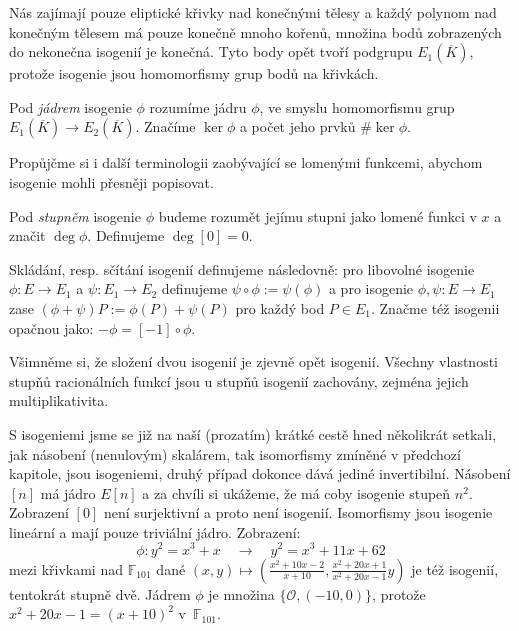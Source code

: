 \documentclass[12pt]{report}
\begin{document}
Nás zajímají pouze eliptické křivky nad konečnými tělesy a každý polynom nad konečným tělesem má pouze konečně mnoho kořenů, množina bodů zobrazených do nekonečna isogenií je konečná. Tyto body opět tvoří podgrupu $E_1 (\overline{K})$, protože isogenie jsou homomorfismy grup bodů na křivkách.

\begin{definice}
Pod \textit{jádrem} isogenie $\phi$ rozumíme jádru $\phi$, ve smyslu homomorfismu grup $E_1 (\overline{K})\longrightarrow E_2(\overline{K})$. Značíme $\ker \phi$ a počet jeho prvků $\# \ker \phi$. 
\end{definice}

Propůjčme si i další terminologii zaobývající se lomenými funkcemi, abychom isogenie mohli přesněji popisovat.

\begin{definice}
Pod \textit{stupněm} isogenie $\phi$ budeme rozumět jejímu stupni jako lomené funkci v $x$ a značit $\deg \phi$. Definujeme $\deg [0] = 0$. 
\end{definice}
 
\begin{znaceni}
Skládání, resp. sčítání isogenií definujeme následovně: pro libovolné isogenie $\phi : E \longrightarrow E_1$ a $\psi : E_1 \longrightarrow E_2$ definujeme $\psi \circ \phi  := \psi(\phi)$ a pro isogenie $\phi,\psi : E \longrightarrow E_1$ zase $(\phi + \psi)P := \phi(P)+\psi(P)$ pro každý bod $P \in E_1$. Značme též isogenii opačnou jako: $- \phi  = [-1] \circ \phi$.
\end{znaceni}

Všimněme si, že složení dvou isogenií je zjevně opět isogenií. Všechny vlastnosti stupňů racionálních funkcí jsou u stupňů isogenií zachovány, zejména jejich multiplikativita.


S isogeniemi jsme se již na naší (prozatím) krátké cestě hned několikrát setkali, jak násobení (nenulovým) skalárem, tak isomorfismy zmíněné v předchozí kapitole, jsou isogeniemi, druhý případ dokonce dává jediné invertibilní. Násobení $[n]$ má jádro $E[n]$ a za chvíli si ukážeme, že má coby isogenie stupeň $n^2$. Zobrazení $[0]$ není surjektivní a proto není isogenií. Isomorfismy jsou isogenie lineární a mají pouze triviální jádro. Zobrazení:
\begin{equation*}
\phi : y^2 = x^3+x \quad \longrightarrow \quad y^2 =  x^3 + 11x + 62
\end{equation*}
mezi křivkami nad $\mathbb{F}_{101}$ dané $(x,y) \mapsto \left(\frac{x^2 + 10x - 2}{x+10},\frac{x^2  + 20x + 1}{x^2 + 20x - 1} y\right)$ je též isogenií, tentokrát stupně dvě. Jádrem $\phi$ je množina $\lbrace \mathcal{O},(-10,0) \rbrace$, protože $x^2 + 20x - 1 = (x+10)^2$ v~$\mathbb{F}_{101}$.
\end{document}
